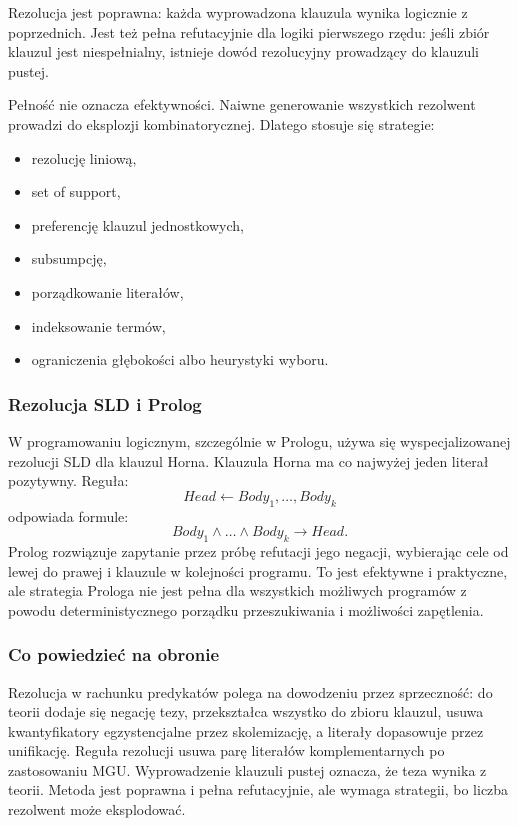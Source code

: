 Rezolucja jest poprawna: każda wyprowadzona klauzula wynika logicznie z poprzednich. Jest też pełna refutacyjnie dla logiki pierwszego rzędu: jeśli zbiór klauzul jest niespełnialny, istnieje dowód rezolucyjny prowadzący do klauzuli pustej.

Pełność nie oznacza efektywności. Naiwne generowanie wszystkich rezolwent prowadzi do eksplozji kombinatorycznej. Dlatego stosuje się strategie:
\begin{itemize}
  \item rezolucję liniową,
  \item set of support,
  \item preferencję klauzul jednostkowych,
  \item subsumpcję,
  \item porządkowanie literałów,
  \item indeksowanie termów,
  \item ograniczenia głębokości albo heurystyki wyboru.
\end{itemize}

\subsubsection{Rezolucja SLD i Prolog}

W programowaniu logicznym, szczególnie w Prologu, używa się wyspecjalizowanej rezolucji SLD dla klauzul Horna. Klauzula Horna ma co najwyżej jeden literał pozytywny. Reguła:
\[
Head \leftarrow Body_1,\dots,Body_k
\]
odpowiada formule:
\[
Body_1\wedge\dots\wedge Body_k\to Head.
\]
Prolog rozwiązuje zapytanie przez próbę refutacji jego negacji, wybierając cele od lewej do prawej i klauzule w kolejności programu. To jest efektywne i praktyczne, ale strategia Prologa nie jest pełna dla wszystkich możliwych programów z powodu deterministycznego porządku przeszukiwania i możliwości zapętlenia.

\subsubsection{Co powiedzieć na obronie}

Rezolucja w rachunku predykatów polega na dowodzeniu przez sprzeczność: do teorii dodaje się negację tezy, przekształca wszystko do zbioru klauzul, usuwa kwantyfikatory egzystencjalne przez skolemizację, a literały dopasowuje przez unifikację. Reguła rezolucji usuwa parę literałów komplementarnych po zastosowaniu MGU. Wyprowadzenie klauzuli pustej oznacza, że teza wynika z teorii. Metoda jest poprawna i pełna refutacyjnie, ale wymaga strategii, bo liczba rezolwent może eksplodować.

